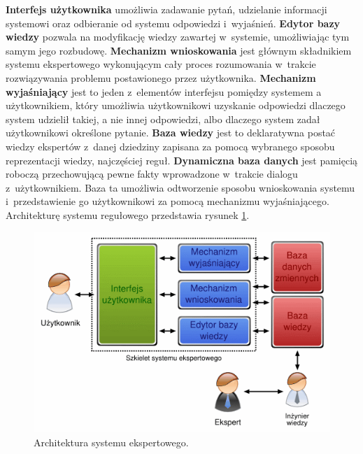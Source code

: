 \textbf{Interfejs użytkownika} umożliwia zadawanie pytań, udzielanie informacji systemowi oraz odbieranie od systemu odpowiedzi i~wyjaśnień.
\textbf{Edytor bazy wiedzy} pozwala na modyfikację wiedzy zawartej w~systemie, umożliwiając tym samym jego rozbudowę.
\textbf{Mechanizm wnioskowania} jest głównym składnikiem systemu ekspertowego wykonującym cały proces rozumowania w~trakcie rozwiązywania problemu postawionego przez użytkownika.
\textbf{Mechanizm wyjaśniający} jest to jeden z~elementów interfejsu pomiędzy systemem a użytkownikiem, który umożliwia użytkownikowi uzyskanie odpowiedzi dlaczego system udzielił takiej, a nie innej odpowiedzi, albo dlaczego system zadał użytkownikowi określone pytanie.
\textbf{Baza wiedzy} jest to deklaratywna postać wiedzy ekspertów z~danej dziedziny zapisana za pomocą wybranego sposobu reprezentacji wiedzy, najczęściej reguł.
\textbf{Dynamiczna baza danych} jest pamięcią roboczą przechowującą pewne fakty wprowadzone w~trakcie dialogu z~użytkownikiem. Baza ta umożliwia odtworzenie sposobu wnioskowania systemu i~przedstawienie go użytkownikowi za pomocą mechanizmu wyjaśniającego\cite{martyniuk_ekspertowe}.
Architekturę systemu regułowego przedstawia rysunek \ref{img:rysunek_expert}.
\begin{figure}[!ht]
\centering	
\includegraphics[scale=0.5]{images/expert-system}
\caption[Rysunek przedstawiający model architektury systemu ekspertowego]{Architektura systemu ekspertowego.}
\label{img:rysunek_expert}
\end{figure}

